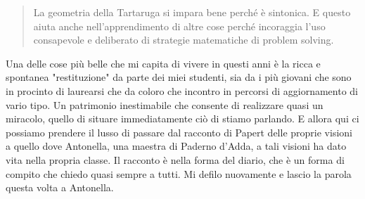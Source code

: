 \begin{quote}
La geometria della Tartaruga si impara bene perché è sintonica. E questo aiuta anche nell'apprendimento  di altre cose perché incoraggia l'uso consapevole e deliberato di strategie matematiche di problem solving.

\end{quote}

Una delle cose più belle che mi capita di vivere in questi anni è la ricca e spontanea "restituzione" da parte dei miei studenti, sia da i più giovani che sono in procinto di laurearsi che da coloro che incontro in percorsi di aggiornamento di vario tipo. Un patrimonio inestimabile che consente di realizzare quasi un miracolo, quello di situare immediatamente ciò di stiamo parlando. E allora qui ci possiamo prendere il lusso di passare dal racconto di Papert delle proprie visioni a quello dove Antonella, una maestra di Paderno d'Adda, a tali visioni ha dato vita nella propria classe. Il racconto è nella forma del diario, che è un forma di compito che chiedo quasi sempre a tutti. Mi defilo nuovamente e lascio la parola questa volta a Antonella.

